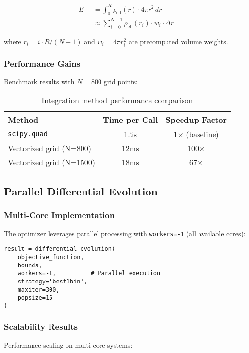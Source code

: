 \documentclass[11pt,a4paper]{article}
\begin{document}
\begin{align}
E_- &= \int_0^R \rho_{\text{eff}}(r) \cdot 4\pi r^2 \, dr \\
&\approx \sum_{i=0}^{N-1} \rho_{\text{eff}}(r_i) \cdot w_i \cdot \Delta r
\end{align}

where $r_i = i \cdot R/(N-1)$ and $w_i = 4\pi r_i^2$ are precomputed volume weights.

\subsubsection{Performance Gains}
Benchmark results with $N = 800$ grid points:

\begin{table}[h]
\centering
\begin{tabular}{lcc}
\toprule
Method & Time per Call & Speedup Factor \\
\midrule
\texttt{scipy.quad} & 1.2s & 1× (baseline) \\
Vectorized grid (N=800) & 12ms & 100× \\
Vectorized grid (N=1500) & 18ms & 67× \\
\bottomrule
\end{tabular}
\caption{Integration method performance comparison}
\end{table}

\subsection{Parallel Differential Evolution}

\subsubsection{Multi-Core Implementation}
The optimizer leverages parallel processing with \texttt{workers=-1} (all available cores):

\begin{verbatim}
result = differential_evolution(
    objective_function,
    bounds,
    workers=-1,          # Parallel execution
    strategy='best1bin',
    maxiter=300,
    popsize=15
)
\end{verbatim}

\subsubsection{Scalability Results}
Performance scaling on multi-core systems:
\end{document}
